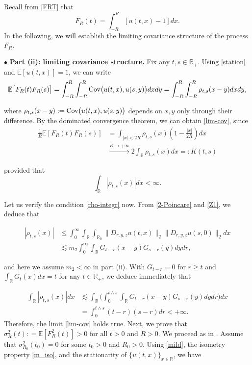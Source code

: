 \documentclass[letterpaper, 11pt,  reqno]{amsart}
\newcommand{\noi}{\noindent}
\newcommand{\R}{\mathbb{R}}
\newcommand{\bul}{\bullet}
\newcommand{\bE}{\mathbb{E}}
\newcommand{\bR}{\mathbb{R}}
\newcommand{\E}{\mathbb{E}}
\newcommand{\s}{\sigma}
\newcommand{\les}{\lesssim}
\numberwithin{equation}{section}
\numberwithin{theorem}{section}
\begin{document}
Recall from \eqref{FRT} that 
\[
F_R(t) = \int_{-R}^R [u(t,x) -1] dx.
\]
In the following, we will establish the limiting covariance structure of the process $F_R$.

\smallskip


\noi
$\bul$  \textbf{Part (ii): \textsf{limiting covariance structure}.} 
Fix any $t,s \in \R_{+}$. Using  \eqref{station} and $\E[ u(t,x) ] = 1$,
we can write 
\[
\bE\big[F_R(t) F_R(s)\big]
=\int_{-R}^R \int_{-R}^R {\rm Cov}\big(   u(t,x),   u(s,y) \big) dxdy
=\int_{-R}^R \int_{-R}^R  \rho_{t,s}(x-y) dxdy,
\]

\noi
where   $\rho_{t,s}(x-y) := {\rm Cov}\big(   u(t,x),   u(s,y) \big) $ depends on $x, y$
only through their difference. 
By the dominated convergence theorem, we can obtain \eqref{lim-cov}, since
\begin{align*}
\frac{1}{R} \bE[F_R(t)F_R(s)] 
& =\int_{|x|<2R} \rho_{t,s}(x)\left(1-\frac{|x|}{2R} \right)dx \\
&\xrightarrow{R\to+\infty}  2\int_{\bR}\rho_{t,s}(x)dx=:K(t,s)
\end{align*}

\noi
provided that 
\begin{equation}
\label{rho-integr}
\int_{\bR}|\rho_{t,s}(x)|dx<\infty.
\end{equation}

\noi
Let us verify the condition \eqref{rho-integr} now. 
From \eqref{2-Poincare} and \eqref{Z1}, we deduce that 

\noi
\begin{align*}
|\rho_{t,s}(x)| & \leq \int_0^{\infty}\int_{\R} \int_{\R_0}\| D_{r,y,z}u(t,x)\|_2 \| D_{r,y,z}u(s,0)\|_2dx \\
&\les m_2 \int_0^{\infty}\int_{\bR} G_{t-r}(x-y) G_{s-r}(y)dydr,
\end{align*}


\noi
and here we assume $m_2 < \infty$ in part (ii).  With $G_{t-r} = 0$ for $r\geq t$
and $\int_\R G_t(x)dx = t$ for any $t\in\R_+$,
we deduce  immediately that 

\noi
\begin{align*}
\int_{\R}|\rho_{t,s}(x)|dx
&\les \int_\R \bigg(  \int_0^{t\wedge s}\int_{\bR} G_{t-r}(x-y) G_{s-r}(y)dydr  \bigg) dx \\
&= \int_0^{t\wedge s} (t-r) (s-r)dr < +\infty.
\end{align*} 
Therefore, the limit \eqref{lim-cov} holds true.  
Next, 
we prove that $\s_R^2(t): = \E[  F^2_R(t)] >0$ for all $t>0$ and $R>0$. 
We proceed as in \cite[Lemma 3.4]{DNZ20}. 
Assume that $\s_{R_0}^2(t_0)=0$ for some $t_0>0$ and $R_0>0$. 
Using \eqref{mild}, the isometry property \eqref{m_iso}, 
and the stationarity of $\{u(t,x)\}_{x \in \bR}$, we have
\end{document}
